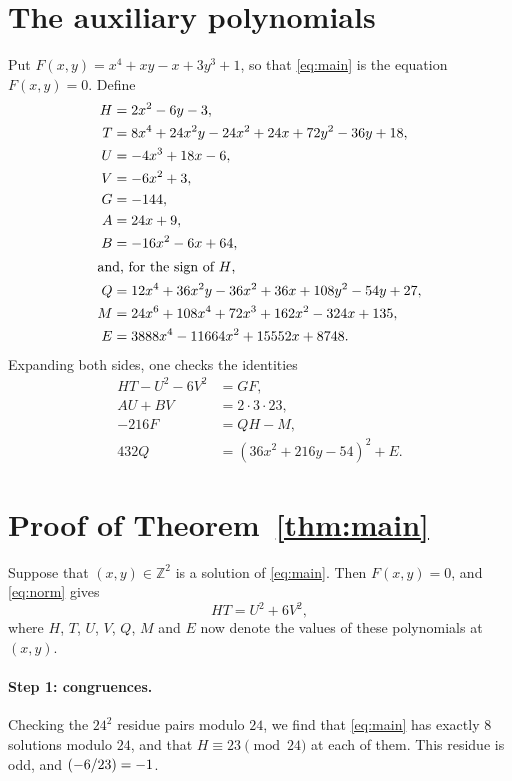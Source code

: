 \documentclass[11pt]{article}
\newcommand{\Z}{\mathbb{Z}}
\newcommand{\leg}[2]{\mathchoice{\biggl(\dfrac{#1}{#2}\biggr)}{(#1/#2)}{(#1/#2)}{(#1/#2)}}
\begin{document}
\section{The auxiliary polynomials}

Put $F(x,y)=x^{4}+xy-x+3y^{3}+1$, so that \eqref{eq:main} is the equation $F(x,y)=0$. Define
\begin{align*}
H&=2x^{2}-6y-3,\\
T&=8x^{4}+24x^{2}y-24x^{2}+24x+72y^{2}-36y+18,\\
U&=-4x^{3}+18x-6,\\
V&=-6x^{2}+3,\\
G&=-144,\\
A&=24x+9,\\
B&=-16x^{2}-6x+64,\\
\intertext{and, for the sign of $H$,}
Q&=12x^{4}+36x^{2}y-36x^{2}+36x+108y^{2}-54y+27,\\
M&=24x^{6}+108x^{4}+72x^{3}+162x^{2}-324x+135,\\
E&=3888x^{4}-11664x^{2}+15552x+8748.
\end{align*}
Expanding both sides, one checks the identities
\begin{align}
HT-U^2-6V^2&=GF,\label{eq:norm}\\
AU+BV&=2\cdot 3\cdot 23,\label{eq:bezout}\\
-216F&=QH-M,\label{eq:sign}\\
432Q&=(36x^{2}+216y-54)^2+E.\label{eq:sign2}
\end{align}

\section{Proof of Theorem~\ref{thm:main}}

Suppose that $(x,y)\in\Z^2$ is a solution of \eqref{eq:main}. Then $F(x,y)=0$, and \eqref{eq:norm} gives
\begin{equation}\label{eq:HT}
HT=U^2+6V^2,
\end{equation}
where $H$, $T$, $U$, $V$, $Q$, $M$ and $E$ now denote the values of these polynomials at $(x,y)$.

\paragraph{Step 1: congruences.} Checking the $24^2$ residue pairs modulo $24$, we find that \eqref{eq:main} has exactly 8 solutions modulo $24$, and that $H\equiv23\pmod{24}$ at each of them. This residue is odd, and $\leg{-6}{23}=-1$.
\end{document}
